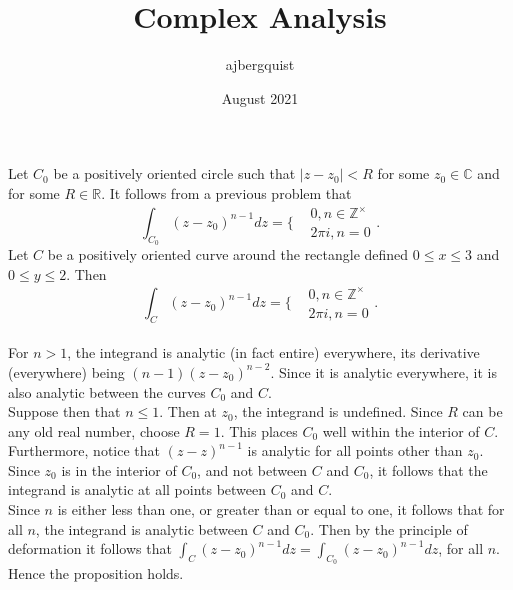 \documentclass{article}
\title{Complex Analysis}
\author{ajbergquist }
\date{August 2021}
\theoremstyle{definition}
\newcommand{\R}{\mathbb{R}}
\newcommand{\Z}{\mathbb{Z}}
\newcommand{\C}{\mathbb{C}}
\newcommand{\cs}[1]{\color{blue}{#1}\normalcolor}
\newcommand{\ab}[1]{\color{red}{#1}\normalcolor}
\begin{document}
 Let $C_0$ be a positively oriented circle such that $|z-z_0|<R$ for some $z_0\in \C$ and for some $R\in \R$. It follows from a previous problem that $$\int_{C_0}(z-z_0)^{n-1}dz = \Big\{\begin{array}{cc}
     &  0, n\in \Z^\times\\
     & 2\pi i, n= 0
\end{array}.$$ Let $C$ be a positively oriented curve around the rectangle defined $0\le x\le 3$ and $0\le y \le 2$. Then $$\int_{C}(z-z_0)^{n-1}dz = \Big\{\begin{array}{cc}
     &  0, n\in \Z^\times\\
     & 2\pi i, n= 0
\end{array}.$$\\

 For $n>1$, the integrand is analytic (in fact entire) everywhere, its derivative (everywhere) being $(n-1)(z-z_0)^{n-2}$. Since it is analytic everywhere, it is also analytic between the curves $C_0$ and $C$. \cs{Is that clear/true? I don't have $C$ in front of me. But some $R$ will work, anyway.}\\\ab{I think my argument was that it's analytic everywhere, either way it would have an antiderivative everywhere, so the integral would be zero right?}
Suppose then that $n\le 1$. Then at $z_0$, the integrand is undefined. Since $R$ can be any old real number, choose $R = 1$. This places $C_0$ well within the interior of $C$. Furthermore, notice that $(z-z)^{n-1}$ is analytic for all points other than $z_0$. Since $z_0$ is in the interior of $C_0$, and not between $C$ and $C_0$, it follows that the integrand is analytic at all points between $C_0$ and $C$. \\

Since $n$ is either less than one, or greater than or equal to one, it follows that for all $n$, the integrand is analytic between $C$ and $C_0$. Then by the principle of deformation it follows that 
$\int_{C}(z-z_0)^{n-1}dz = \int_{C_0}(z-z_0)^{n-1}dz$, for all $n$. Hence the proposition holds.

\cs{5/5}
\end{document}

